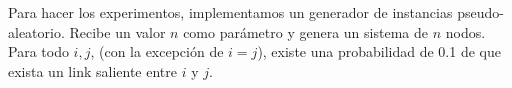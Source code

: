 Para hacer los experimentos, implementamos un generador de instancias pseudo-aleatorio. Recibe un valor $n$ como parámetro y genera
un sistema de $n$ nodos. Para todo $i,j$, (con la excepción de $i=j$), existe una probabilidad de 0.1 de que exista un link saliente
entre $i$ y $j$.




